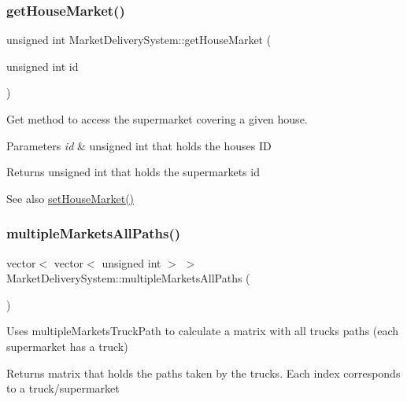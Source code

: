 \subsubsection{\texorpdfstring{get\+House\+Market()}{getHouseMarket()}}
{\footnotesize\ttfamily unsigned int Market\+Delivery\+System\+::get\+House\+Market (\begin{DoxyParamCaption}\item[{unsigned int}]{id }\end{DoxyParamCaption})}



Get method to access the supermarket covering a given house. 


\begin{DoxyParams}{Parameters}
{\em id} & unsigned int that holds the house\textquotesingle{}s ID \\
\hline
\end{DoxyParams}
\begin{DoxyReturn}{Returns}
unsigned int that holds the supermarket\textquotesingle{}s id 
\end{DoxyReturn}
\begin{DoxySeeAlso}{See also}
\hyperlink{class_market_delivery_system_a2f72e9abcf4e6f7f36ebb58fbc54dc3f}{set\+House\+Market()} 
\end{DoxySeeAlso}
\hypertarget{class_market_delivery_system_a74907c35eeafc05d77b90d4b99b3dcd5}{}\label{class_market_delivery_system_a74907c35eeafc05d77b90d4b99b3dcd5} 
\subsubsection{\texorpdfstring{multiple\+Markets\+All\+Paths()}{multipleMarketsAllPaths()}}
{\footnotesize\ttfamily vector$<$ vector$<$ unsigned int $>$ $>$ Market\+Delivery\+System\+::multiple\+Markets\+All\+Paths (\begin{DoxyParamCaption}{ }\end{DoxyParamCaption})}



Uses multiple\+Markets\+Truck\+Path to calculate a matrix with all trucks paths\textquotesingle{} (each supermarket has a truck) 

\begin{DoxyReturn}{Returns}
matrix that holds the paths taken by the trucks. Each index corresponds to a truck/supermarket 
\end{DoxyReturn}
\hypertarget{class_market_delivery_system_a3bb2340fbf83f3fbb5e67b1dca4b6c53}{}\label{class_market_delivery_system_a3bb2340fbf83f3fbb5e67b1dca4b6c53} 
